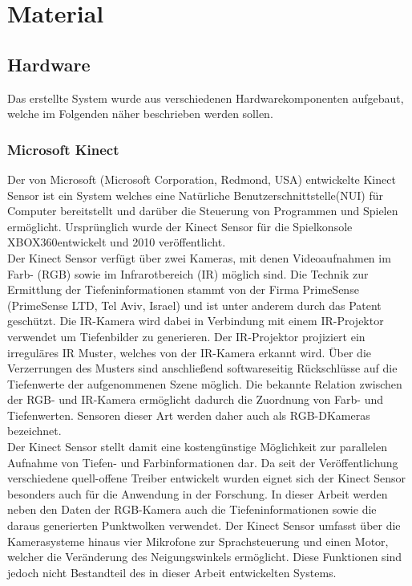 \chapter{Material}
\label{chap:material}
\section{Hardware}
Das erstellte System wurde aus verschiedenen Hardwarekomponenten aufgebaut, welche im Folgenden näher beschrieben werden sollen. 

\subsection{Microsoft Kinect}
Der von Microsoft (Microsoft Corporation, Redmond, USA) entwickelte Kinect Sensor ist ein System welches eine Natürliche Benutzerschnittstelle\red[Definition] (NUI) für Computer  bereitstellt und darüber die Steuerung von Programmen und Spielen ermöglicht. Ursprünglich wurde der Kinect Sensor für die Spielkonsole XBOX360\red[TM] entwickelt und 2010 veröffentlicht.\\
Der Kinect Sensor verfügt über zwei Kameras, mit denen Videoaufnahmen im Farb- (RGB) sowie im Infrarotbereich (IR) möglich sind. Die Technik zur Ermittlung der Tiefeninformationen stammt von der Firma PrimeSense (PrimeSense LTD, Tel Aviv, Israel) und ist unter anderem durch das Patent \cite{Freedman2008} geschützt. Die IR-Kamera wird dabei in Verbindung mit einem IR-Projektor verwendet um Tiefenbilder zu generieren. Der IR-Projektor projiziert ein irreguläres IR Muster, welches von der IR-Kamera erkannt wird. Über die Verzerrungen des Musters sind anschließend softwareseitig Rückschlüsse auf die Tiefenwerte der aufgenommenen Szene möglich. Die bekannte Relation zwischen der RGB- und IR-Kamera ermöglicht dadurch die Zuordnung von Farb- und Tiefenwerten. Sensoren dieser Art werden daher auch als RGB-D\red[footnote] Kameras bezeichnet.\\
Der Kinect Sensor stellt damit eine kostengünstige Möglichkeit zur parallelen Aufnahme von Tiefen- und Farbinformationen dar. Da seit der Veröffentlichung verschiedene quell-offene Treiber entwickelt wurden eignet sich der Kinect Sensor besonders auch für die Anwendung in der Forschung. In dieser Arbeit werden neben den Daten der RGB-Kamera auch die Tiefeninformationen sowie die daraus generierten Punktwolken verwendet. Der Kinect Sensor umfasst über die Kamerasysteme hinaus vier Mikrofone zur Sprachsteuerung und einen Motor, welcher die Veränderung des Neigungswinkels ermöglicht. Diese Funktionen sind jedoch nicht Bestandteil des in dieser Arbeit entwickelten Systems.\\

